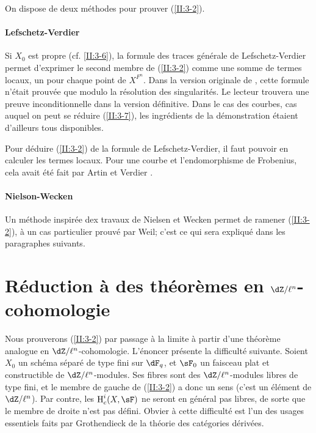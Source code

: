 On dispose de deux méthodes pour prouver (\ref{II:3-2}). 


\paragraph{Lefschetz-Verdier}
Si $X_0$ est propre (cf. \ref{II:3-6}), la formule des traces générale de 
Lefschetz-Verdier permet d'exprimer le second membre de (\ref{II:3-2}) comme 
une somme de termes locaux, un pour chaque point de $X^{F^n}$. Dans la version 
originale de \cite{sga5}, cette formule n'était prouvée que modulo la 
résolution des singularités. Le lecteur trouvera une preuve inconditionnelle 
dans la version définitive. Dans le cas des courbes, cas auquel on peut se 
réduire (\ref{II:3-7}), les ingrédients de la démonstration étaient 
d'ailleurs tous disponibles. 

Pour déduire (\ref{II:3-2}) de la formule de Lefschetz-Verdier, il faut 
pouvoir en calculer les termes locaux. Pour une courbe et l'endomorphisme de 
Frobenius, cela avait été fait par Artin et Verdier \cite{ve67}. 


\paragraph{Nielson-Wecken}
Un méthode inspirée dex travaux de Nielsen et Wecken permet de ramener 
(\ref{II:3-2}), à un cas particulier prouvé par Weil; c'est ce qui sera 
expliqué dans les paragraphes suivants. 










\section{Réduction à des théorèmes en \texorpdfstring{$\dZ/\ell^n$}{Z/l n}-cohomologie}\label{II:4}

Nous prouverons (\ref{II:3-2}) par passage à la limite à partir d'une 
théorème analogue en $\dZ/\ell^n$-cohomologie. L'énoncer présente la 
difficulté suivante. Soient $X_0$ un schéma séparé de type fini sur 
$\dF_q$, et $\sF_0$ un faisceau plat et constructible de $\dZ/\ell^n$-modules. 
Ses fibres sont des $\dZ/\ell^n$-modules libres de type fini, et le membre de 
gauche de (\ref{II:3-2}) a donc un sens (c'est un élément de $\dZ/\ell^n$). 
Par contre, les $\h_c^i(X,\sF)$ ne seront en général pas libres, de sorte 
que le membre de droite n'est pas défini. Obvier à cette difficulté est 
l'un des usages essentiels faits par Grothendieck de la théorie des 
catégories dérivées.





